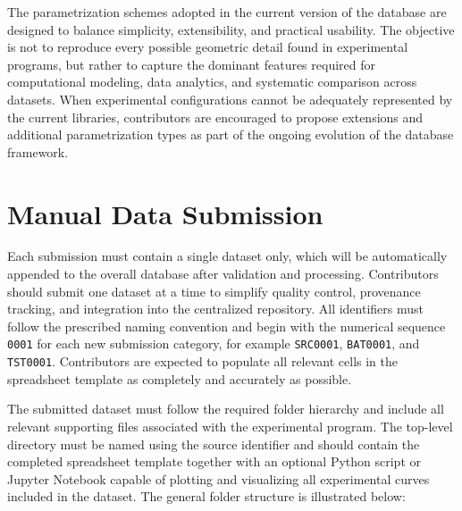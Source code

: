 \documentclass[11pt]{book}
\begin{document}
The parametrization schemes adopted in the current version of the database are designed to balance simplicity, extensibility, and practical usability. The objective is not to reproduce every possible geometric detail found in experimental programs, but rather to capture the dominant features required for computational modeling, data analytics, and systematic comparison across datasets. When experimental configurations cannot be adequately represented by the current libraries, contributors are encouraged to propose extensions and additional parametrization types as part of the ongoing evolution of the database framework.

\vspace{5mm}
\noindent
{}



\section{Manual Data Submission}

Each submission must contain a single dataset only, which will be automatically appended to the overall database after validation and processing. Contributors should submit one dataset at a time to simplify quality control, provenance tracking, and integration into the centralized repository. All identifiers must follow the prescribed naming convention and begin with the numerical sequence \texttt{0001} for each new submission category, for example \texttt{SRC0001}, \texttt{BAT0001}, and \texttt{TST0001}. Contributors are expected to populate all relevant cells in the spreadsheet template as completely and accurately as possible.

The submitted dataset must follow the required folder hierarchy and include all relevant supporting files associated with the experimental program. The top-level directory must be named using the source identifier and should contain the completed spreadsheet template together with an optional Python script or Jupyter Notebook capable of plotting and visualizing all experimental curves included in the dataset. The general folder structure is illustrated below:
\end{document}
